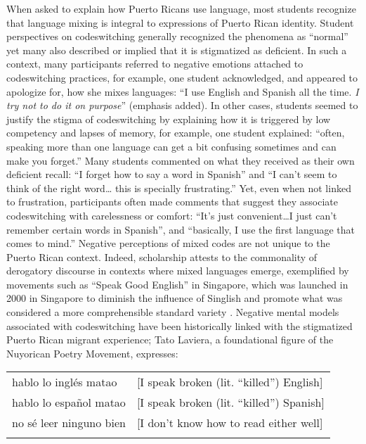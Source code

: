 \documentclass[output=paper,colorlinks,citecolor=brown]{langscibook}
\begin{document}
When asked to explain how Puerto Ricans use language, most students recognize that language mixing is integral to expressions of Puerto Rican identity. Student perspectives on codeswitching generally recognized the phenomena as “normal” yet many also described or implied that it is stigmatized as deficient. In such a context, many participants referred to negative emotions attached to codeswitching practices, for example, one student acknowledged, and appeared to apologize for, how she mixes languages: “I use English and Spanish all the time. \emph{I try not to do it on purpose}” (emphasis added). In other cases, students seemed to justify the stigma of codeswitching by explaining how it is triggered by low competency and lapses of memory, for example, one student explained: “often, speaking more than one language can get a bit confusing sometimes and can make you forget.” Many students commented on what they received as their own deficient recall: “I forget how to say a word in Spanish” and “I can’t seem to think of the right word… this is specially frustrating.” Yet, even when not linked to frustration, participants often made comments that suggest they associate codeswitching with carelessness or comfort: “It’s just convenient…I just can’t remember certain words in Spanish”, and “basically, I use the first language that comes to mind.”  Negative perceptions of mixed codes are not unique to the Puerto Rican context. Indeed, scholarship attests to the commonality of derogatory discourse in contexts where mixed languages emerge, exemplified by movements such as “Speak Good English” in Singapore, which was launched in 2000 in Singapore to diminish the influence of Singlish and promote what was considered a more comprehensible standard variety \citep[262]{Lim2015}. Negative mental models associated with codeswitching have been historically linked with the stigmatized Puerto Rican migrant experience; Tato Laviera, a foundational figure of the Nuyorican Poetry Movement, expresses:

\begin{tabular}{ll}
    hablo lo inglés matao & [I speak broken (lit. “killed”) English] \\
    hablo lo español matao & [I speak broken (lit. “killed”) Spanish] \\
    no sé leer ninguno bien & [I don’t know how to read either well] \\
    & \citep[7]{Laviera_2014}
\end{tabular}
\end{document}
